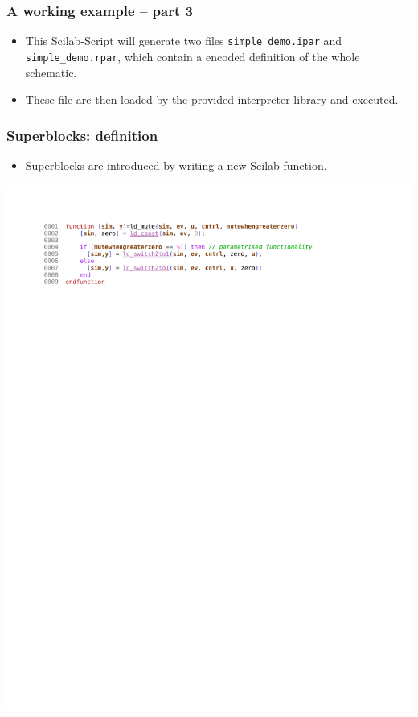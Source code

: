\documentclass[serif,9pt,xcolor=dvipsnames]{beamer}
\begin{document}
\begin{frame}[fragile]
  \frametitle{A working example -- part 3}
 \begin{itemize}
  \item This Scilab-Script will generate two files \texttt{simple\_demo.ipar} and \texttt{simple\_demo.rpar}, which contain a encoded definition of the whole schematic.
\item These file are then loaded by the provided interpreter library and executed.
 \end{itemize}

\end{frame}


\begin{frame}[fragile]
 \frametitle{Superblocks: definition}
 
\begin{itemize}
 \item Superblocks are introduced by writing a new Scilab function.
\end{itemize}

\centering \includegraphics[trim=3cm 22cm 4cm 1.4cm, clip, width=0.85\linewidth]{figures/ld_mute.pdf} 


%     


\end{frame}
\end{document}

